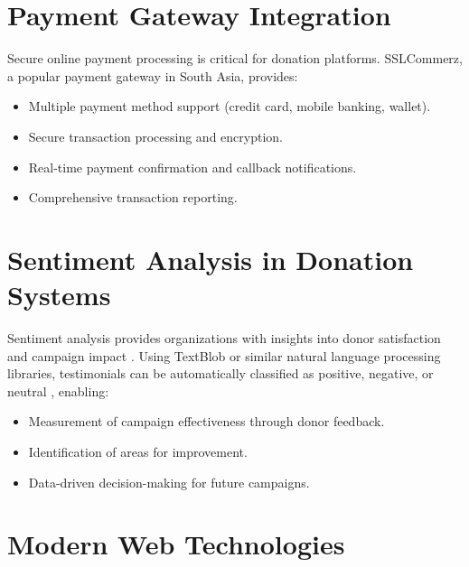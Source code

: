 \section{Payment Gateway Integration}

Secure online payment processing is critical for donation platforms. SSLCommerz, a popular payment gateway in South Asia, provides:
\begin{itemize}
    \item Multiple payment method support (credit card, mobile banking, wallet).
    \item Secure transaction processing and encryption.
    \item Real-time payment confirmation and callback notifications.
    \item Comprehensive transaction reporting.
\end{itemize}

\section{Sentiment Analysis in Donation Systems}

Sentiment analysis provides organizations with insights into donor satisfaction and campaign impact \cite{hutto2014vader}. Using TextBlob or similar natural language processing libraries, testimonials can be automatically classified as positive, negative, or neutral \cite{wang2021enhancing}, enabling:
\begin{itemize}
    \item Measurement of campaign effectiveness through donor feedback.
    \item Identification of areas for improvement.
    \item Data-driven decision-making for future campaigns.
\end{itemize}

\section{Modern Web Technologies}

